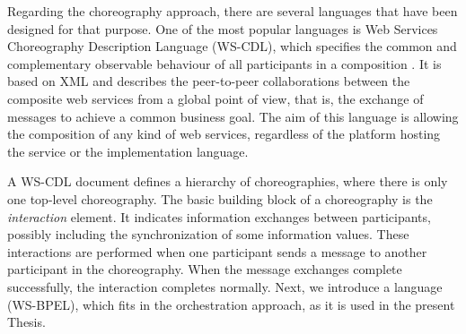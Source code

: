 Regarding the choreography approach, there are several languages that 
have been designed for that purpose. One of the most popular languages 
is Web Services Choreography Description Language (WS-CDL), 
which specifies the common and complementary observable behaviour of 
all participants in a composition \cite{W3C2005}. 
It is based on XML and describes the peer-to-peer collaborations 
between the composite web services from a global point of view, that is, 
the exchange of messages to achieve a common business goal. 
The aim of this language is allowing the composition of any kind of web services, 
regardless of the platform hosting the service or the implementation language. 


A WS-CDL document defines a hierarchy of choreographies, where there is only one top-level choreography. 
The basic building block of a choreography is the \textit{interaction} element. It indicates information exchanges between participants, possibly including the synchronization of some information values. These interactions are performed when one participant sends a message to another participant in the choreography. When the message exchanges complete successfully, the interaction completes normally. Next, we introduce a language (WS-BPEL), which fits 
in the orchestration approach, as it is used in the present Thesis.

